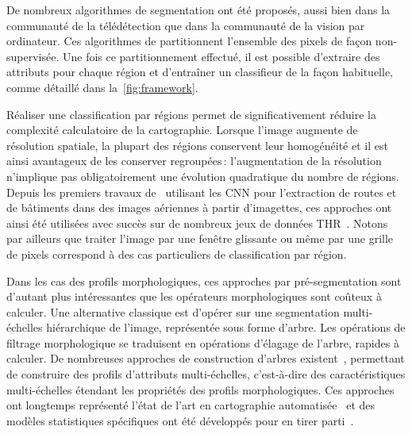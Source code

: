 De nombreux algorithmes de segmentation ont été proposés, aussi bien dans la communauté de la télédétection que dans la communauté de la vision par ordinateur. Ces algorithmes de partitionnent l'ensemble des pixels de façon non-supervisée. Une fois ce partitionnement effectué, il est possible d'extraire des attributs pour chaque région et d'entraîner un classifieur de la façon habituelle, comme détaillé dans la~\cref{fig:framework}.

Réaliser une classification par régions permet de significativement réduire la complexité calculatoire de la cartographie. Lorsque l'image augmente de résolution spatiale, la plupart des régions conservent leur homogénéité et il est ainsi avantageux de les conserver regroupées\,: l'augmentation de la résolution n'implique pas obligatoirement une évolution quadratique du nombre de régions. Depuis les premiers travaux de~\citet{mnih_machine_2013} utilisant les \gls{CNN} pour l'extraction de routes et de bâtiments dans des images aériennes à partir d'imagettes, ces approches ont ainsi été utilisées avec succès sur de nombreux jeux de données \gls{THR}~\cite{lagrange_benchmarking_2015,vargas_superpixel-based_2014}. Notons par ailleurs que traiter l'image par une fenêtre glissante ou même par une grille de pixels correspond à des cas particuliers de classification par région.

Dans les cas des profils morphologiques, ces approches par pré-segmentation sont d'autant plus intéressantes que les opérateurs morphologiques sont coûteux à calculer. Une alternative classique est d'opérer sur une segmentation multi-échelles hiérarchique de l'image, représentée sous forme d'arbre. Les opérations de filtrage morphologique se traduisent en opérations d'élagage de l'arbre, rapides à calculer. De nombreuses approches de construction d'arbres existent~\cite{bosilj_indexation_2016}, permettant de construire des profils d'attributs multi-échelles, c'est-à-dire des caractéristiques multi-échelles étendant les propriétés des profils morphologiques. Ces approches ont longtemps représenté l'état de l'art en cartographie automatisée~\cite{pham_feature_2018} et des modèles statistiques spécifiques ont été développés pour en tirer parti~\cite{cui_combining_2016}.

